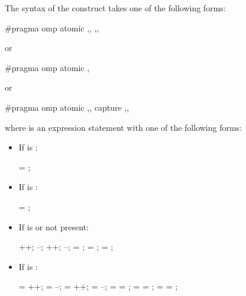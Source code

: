 \begin{ccppspecific}
The syntax of the  construct takes one of the following forms:

\begin{ompcPragma}
#pragma omp atomic \plc{[clause[[[},\plc{] clause] ... ] [},\plc{]]} 
                   \plc{[[},\plc{] clause [[[},\plc{] clause] ... ]]} 
\end{ompcPragma}

or

\begin{ompcPragma}
#pragma omp atomic \plc{[clause[[},\plc{] clause] ... ]} 
\end{ompcPragma}

or

\begin{ompcPragma}
#pragma omp atomic \plc{[clause[[[},\plc{] clause] ... ] [},\plc{]]} capture
                   \plc{[[},\plc{] clause [[[},\plc{] clause] ... ]]} 
\end{ompcPragma}

where  is an expression statement with one of the following forms:

\begin{itemize}
\item If  is :
\begin{ompSyntax}
 = ;
\end{ompSyntax}

\item If  is :
\begin{ompSyntax}
 = ;
\end{ompSyntax}

\item If  is  or not present:
\begin{ompSyntax}
++;
--;
++;
--;
 = ;
 =   ;
 =   ;
\end{ompSyntax}

\item If  is :
\begin{ompSyntax}
 = ++;
 = --;
 = ++;
 = --;
 =  = ;
 =  =   ;
 =  =   ;
\end{ompSyntax}


\end{itemize}
\end{ccppspecific}
